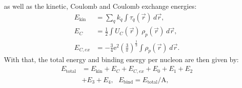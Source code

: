 \documentclass[4p]{elsarticle}
\begin{document}
as well as the kinetic, Coulomb and Coulomb exchange energies:
\begin{align}
E_\mathrm{kin} &= \sum\nolimits_{q} k_q \int  \tau_q(\vec{r}) \: d \vec{r}, 
\label{energy_kin}\\
E_{C} &= \frac{1}{2} \int U_C  (\vec{r}) \: \rho_p (\vec{r}) \: d \vec{r}, \\
E_{C,ex} &= - \frac{3}{4} \mathrm{e}^2 \left( \frac{3}{\pi} \right)^\frac{1}{3} \int \rho_p (\vec{r}) \: d \vec{r}.
\label{energy_coulomb_ex}
\end{align}
With that, the total energy and binding energy per nucleon are then given by:
\begin{align}
E_\mathrm{total} &= E_\mathrm{kin} + E_C + E_{C,ex} + E_0 + E_1 + E_2 \nonumber\\
& + E_3 + E_4, \:\:\: E_\mathrm{bind} = E_\mathrm{total} / \mathrm{A}, 
\label{energy_total}
\end{align}
\end{document}
